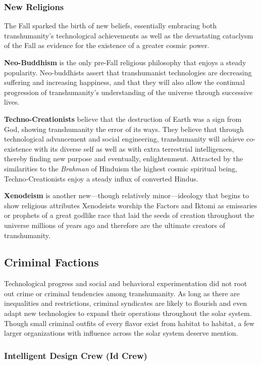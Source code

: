 \subsubsection{New Religions}

The Fall sparked the birth of new beliefs, essentially
embracing both transhumanity's technological
achievements as well as the devastating cataclysm 
of the Fall as evidence for the existence of a greater 
cosmic power.

\textbf{Neo-Buddhism} is the only pre-Fall religious philosophy
that enjoys a steady popularity. Neo-buddhists
assert that transhumanist technologies are decreasing 
suffering and increasing happiness, and that they will 
also allow the continual progression of transhumanity's 
understanding of the universe through successive lives.

\textbf{Techno-Creationists} believe that the destruction of 
Earth was a sign from God, showing transhumanity 
the error of its ways. They believe that through technological
advancement and social engineering, transhumanity
will achieve co-existence with its diverse self
as well as with extra terrestrial intelligences, thereby 
finding new purpose and eventually, enlightenment. 
Attracted by the similarities to the \textit{Brahman }of Hinduism
the highest cosmic spiritual being, Techno-Creationists
enjoy a steady influx of converted Hindus.

\textbf{Xenodeism} is another new—though relatively 
minor—ideology that begins to show religious attributes
Xenodeists worship the Factors and Iktomi
as emissaries or prophets of a great godlike race that 
laid the seeds of creation throughout the universe 
millions of years ago and therefore are the ultimate 
creators of transhumanity.

\subsection{Criminal Factions}

Technological progress and social and behavioral 
experimentation did not root out crime or criminal 
tendencies among transhumanity. As long as there 
are inequalities and restrictions, criminal syndicates
are likely to flourish and even adapt new
technologies to expand their operations throughout
the solar system. Though small criminal outfits
of every flavor exist from habitat to habitat, a few 
larger organizations with influence across the solar 
system deserve mention.

\subsubsection{Intelligent Design Crew (Id Crew)}

